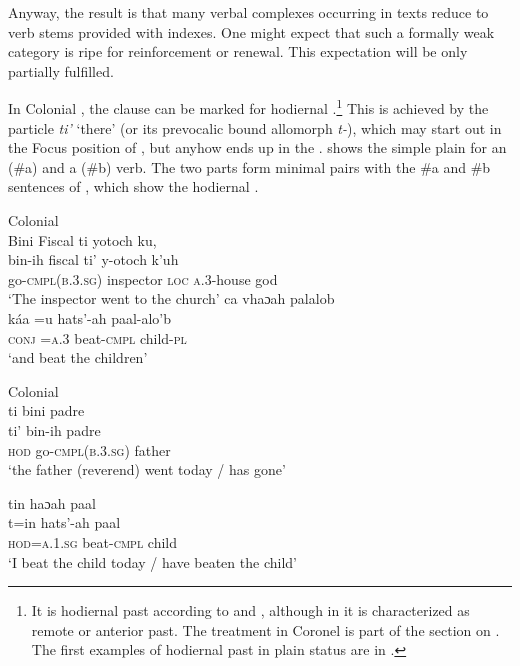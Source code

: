\documentclass[output=paper]{langsci/langscibook}
\begin{document}
Anyway, the result is that many  verbal complexes occurring in texts reduce to verb stems provided with indexes. One might expect that such a formally weak category is ripe for reinforcement or renewal. This expectation will be only partially fulfilled.

In Colonial  , the  clause can be marked for hodiernal .\footnote{It is hodiernal past according to \citet[41f]{Coronel1620} and \citet[35r]{SanBuenaventura1684}, although in \citet[41]{Smailus1989} it is characterized as remote or anterior past. The treatment in Coronel is part of the section on . The first examples of hodiernal past in plain status are in \citet{SanBuenaventura1684}.} This is achieved by the particle \textit{ti'} ‘there’ (or its prevocalic bound allomorph \textit{t-}), which may start out in the Focus position of , but anyhow ends up in the .  shows the simple plain  for an  (\#a) and a  (\#b) verb. The two parts form minimal pairs with the \#a and \#b sentences of , which show the hodiernal .\largerpage[2]

\ea\label{ex:lehmann:16}
Colonial  \\
\ea 
Bini           Fiscal    ti     yotoch     ku,\\
\gll   bin-ih          fiscal    ti’    y-otoch    k’uh\\
go-\textsc{cmpl(b.3.sg)}  inspector  \textsc{loc}  \textsc{a}.3-house    god\\
\glt ‘The inspector went to the church’
\ex 
ca         vhaɔah     palalob\\
\gll   káa  =u    hats’-ah    paal-alo’b\\
\textsc{conj}  \textsc{=a.3}    beat-\textsc{cmpl}    child-\textsc{pl}\\
\glt ‘and beat the children’ \citep[23r-v]{SanBuenaventura1684}
\z
\z 

\ea\label{ex:lehmann:17}
Colonial  \\
\ea 
ti      bini            padre\\
\gll  ti’      bin-ih          padre\\
  \textsc{hod}    go-\textsc{cmpl(b.3.sg)}  father\\
\glt ‘the father (reverend) went today / has gone’


\ex 
tin        haɔah      paal\\
\gll   t=in        hats'-ah    paal\\
\textsc{hod=a.1.sg}  beat-\textsc{cmpl}    child\\
\glt ‘I beat the child today / have beaten the child’ \citep[35r]{SanBuenaventura1684}
\z
\z 
\end{document}
